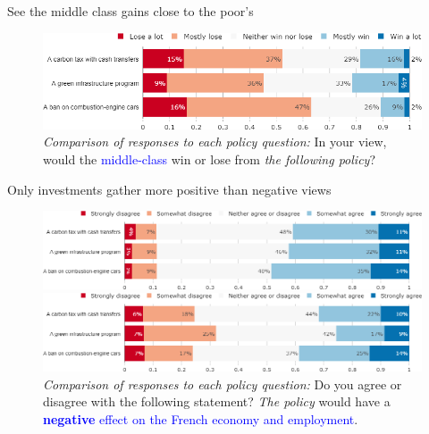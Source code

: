 \begin{framefont}{\small}
\begin{frame}{See the middle class gains close to the poor's}%
\begin{figure}[h!]
\centering
\caption{\textit{Comparison of responses to each policy question:} In your view, would the \textcolor{blue}{middle-class} win or lose from \textit{the following policy}?}
\includegraphics[width=.61\paperwidth]{../figures/FR/policies_win_lose_middle_FR.png}
\end{figure}
\end{frame}

\begin{frame}{Only investments gather more positive than negative views}%
\begin{figure}[h!]
\centering
\caption{\textit{Comparison of responses to each policy question:} Do you agree or disagree with the following statement? \textit{The policy} would have a \textcolor{blue}{\textbf{large} effect on the French economy and employment}.}
\includegraphics[width=.78\paperwidth]{../figures/FR/policies_large_effect_FR.png}
\vspace{-.1cm}
\centering
\caption{\textit{Comparison of responses to each policy question:} Do you agree or disagree with the following statement? \textit{The policy} would have a \textcolor{blue}{\textbf{negative} effect on the French economy and employment}.}
\includegraphics[width=.78\paperwidth]{../figures/FR/policies_negative_effect_FR.png}
\end{figure}
\end{frame}


\end{framefont}
